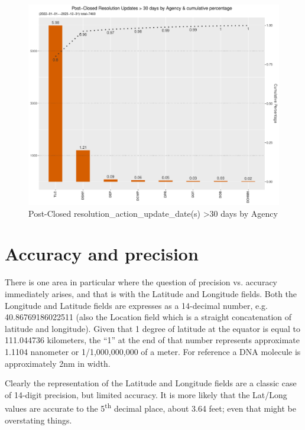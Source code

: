 \documentclass[12pt, titlepage]{article}
\begin{document}
	\begin{figure}[tbp]
		\centering
		\includegraphics[width = \textwidth]{postClosedBarChart.pdf}
		\caption{Post-Closed resolution\_action\_update\_date(s) 
		\textgreater30 days by Agency}
		\label{fig:resolution-by-agency}
	\end{figure}		



\section{Accuracy and precision}
\label{sec:precision}
There is one area in particular where the question of precision vs. 
accuracy immediately arises, and that is with the Latitude and Longitude 
fields. Both the Longitude and Latitude fields are expresses as a 14-decimal 
number, e.g. 40.86769186022511 (also the Location field which is a 
straight concatenation of latitude and longitude). Given that 1 
degree of latitude at the equator is equal to 111.044736 kilometers, 
the ``1'' at the end of that number represents approximate 1.1104 nanometer 
or 1/1,000,000,000 of a meter. For reference a DNA molecule is 
approximately 2nm in width. 

Clearly the representation of the Latitude and Longitude fields are a 
classic case of 14-digit precision, but limited accuracy. It is more likely 
that the Lat/Long values are accurate to the 5\textsuperscript{th} decimal place, 
about 3.64 feet; even that might be overstating things. 
\end{document}
